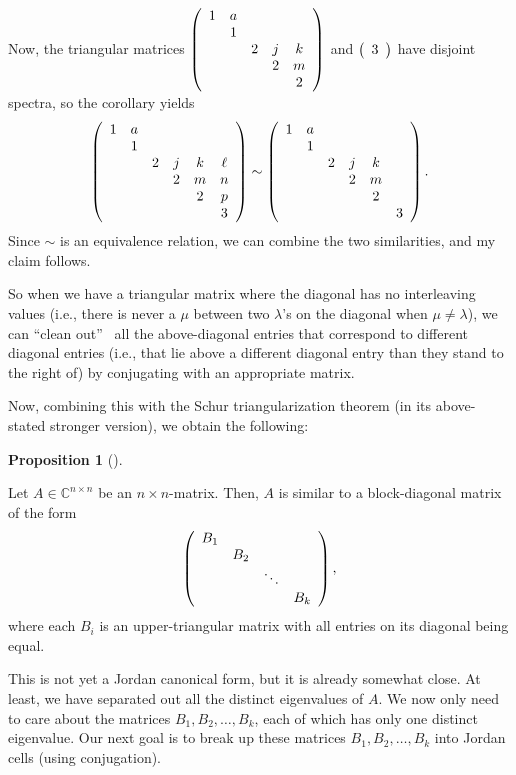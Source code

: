 \documentclass[numbers=enddot,12pt,final,onecolumn,notitlepage]{scrartcl}%
\numberwithin{exer}{subsection}
\theoremstyle{definition}
\newtheorem{prop}[theo]{Proposition}
\newenvironment{proposition}[1][]
{\begin{prop}[#1]\begin{leftbar}}
{\end{leftbar}\end{prop}}
\begin{document}
Now, the triangular matrices $\left(
\begin{array}
[c]{ccccc}%
1 & a &  &  & \\
& 1 &  &  & \\
&  & 2 & j & k\\
&  &  & 2 & m\\
&  &  &  & 2
\end{array}
\right)  $ and $\left(
\begin{array}
[c]{c}%
3
\end{array}
\right)  $ have disjoint spectra, so the corollary yields%
\[
\left(
\begin{array}
[c]{cccccc}%
1 & a &  &  &  & \\
& 1 &  &  &  & \\
&  & 2 & j & k & \ell\\
&  &  & 2 & m & n\\
&  &  &  & 2 & p\\
&  &  &  &  & 3
\end{array}
\right)  \sim\left(
\begin{array}
[c]{cccccc}%
1 & a &  &  &  & \\
& 1 &  &  &  & \\
&  & 2 & j & k & \\
&  &  & 2 & m & \\
&  &  &  & 2 & \\
&  &  &  &  & 3
\end{array}
\right)  .
\]
Since $\sim$ is an equivalence relation, we can combine the two similarities,
and my claim follows.

So when we have a triangular matrix where the diagonal has no interleaving
values (i.e., there is never a $\mu$ between two $\lambda$'s on the diagonal
when $\mu\neq\lambda$), we can \textquotedblleft clean out\textquotedblright%
\ all the above-diagonal entries that correspond to different diagonal entries
(i.e., that lie above a different diagonal entry than they stand to the right
of) by conjugating with an appropriate matrix.

Now, combining this with the Schur triangularization theorem (in its
above-stated stronger version), we obtain the following:

\begin{proposition}
Let $A\in\mathbb{C}^{n\times n}$ be an $n\times n$-matrix. Then, $A$ is
similar to a block-diagonal matrix of the form%
\[
\left(
\begin{array}
[c]{cccc}%
B_{1} &  &  & \\
& B_{2} &  & \\
&  & \ddots & \\
&  &  & B_{k}%
\end{array}
\right)  ,
\]
where each $B_{i}$ is an upper-triangular matrix with all entries on its
diagonal being equal.
\end{proposition}

This is not yet a Jordan canonical form, but it is already somewhat close. At
least, we have separated out all the distinct eigenvalues of $A$. We now only
need to care about the matrices $B_{1},B_{2},\ldots,B_{k}$, each of which has
only one distinct eigenvalue. Our next goal is to break up these matrices
$B_{1},B_{2},\ldots,B_{k}$ into Jordan cells (using conjugation).
\end{document}
